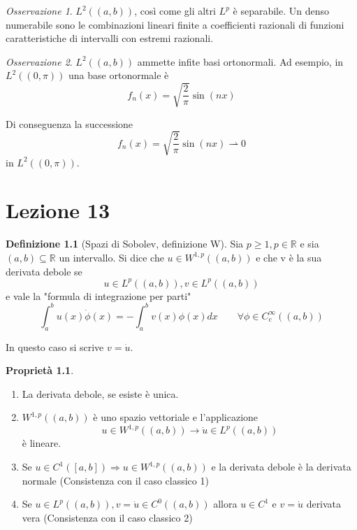 \documentclass[a4paper]{book}
\theoremstyle{definition}
\newtheorem{defn}{Definizione}
\theoremstyle{remark}
\newtheorem{oss}{Osservazione}
\theoremstyle{definition}
\newtheorem{prop}{Proprietà}
\newcommand{\bbr}{\mathbb{R}}
\newcommand{\ra}{\Rightarrow}
\begin{document}
\begin{oss}
	$L^2((a,b))$, così come gli altri $L^p$ è separabile. Un denso numerabile sono le combinazioni lineari finite a coefficienti razionali di funzioni caratteristiche di intervalli con estremi razionali.
\end{oss}

\begin{oss}
	$L^2((a,b))$ ammette infite basi ortonormali. Ad esempio, in $L^2((0, \pi))$ una base ortonormale è
	$$f_n(x) = \sqrt{\frac2\pi}\sin(nx)$$
\end{oss}

Di conseguenza la successione $$f_n(x) = \sqrt{\frac2\pi}\sin(nx) \rightharpoonup 0$$ in $L^2((0, \pi))$.

\chapter{Lezione 13}

\begin{defn}[Spazi di Sobolev, definizione W]
	Sia $p\ge 1, p \in \bbr$ e sia $(a,b)\subseteq \bbr$ un intervallo. Si dice che $u \in W^{1, p}((a,b))$ e che v è la sua derivata debole se 
	$$u \in L^p((a,b)), v \in L^p((a,b))$$ e vale la "formula di integrazione per parti"
	$$\int_a^b u(x)\dot{\phi}(x) = - \int_a^b v(x)\phi(x)dx \qquad \forall \phi \in C^\infty_c((a,b))$$
\end{defn}

In questo caso si scrive $v = \dot{u}$.

\begin{prop}
	\begin{enumerate}
		\item La derivata debole, se esiste è unica.
		\item $W^{1, p}((a,b))$ è uno spazio vettoriale e l'applicazione $$u \in W^{1, p}((a,b))\to \dot{u} \in L^p((a,b))$$ è lineare.
		\item Se $u \in C^1([a,b]) \ra u \in W^{1, p}((a,b))$ e la derivata debole è la derivata normale (Consistenza con il caso classico 1)
		\item Se $u \in L^p((a,b)), v = \dot{u} \in C^0((a,b))$ allora $u \in C^1$ e $v = \dot{u}$ derivata vera (Consistenza con il caso classico 2)
	\end{enumerate}
\end{prop}
\end{document}
